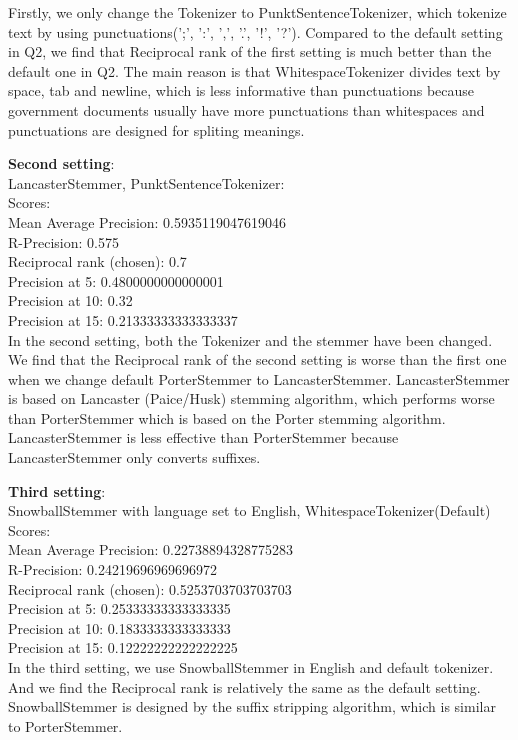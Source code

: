 \documentclass{article}
\begin{document}
Firstly, we only change the Tokenizer to PunktSentenceTokenizer, which tokenize 
text by using punctuations(';', ':', ',', '.', '!', '?'). Compared to the 
default setting in Q2, we find that Reciprocal rank of the first setting is 
much better than the default one in Q2. The main reason is that 
WhitespaceTokenizer divides text by space, tab and newline, which is less 
informative than punctuations because government documents usually have more 
punctuations than whitespaces and punctuations are designed for spliting meanings. 

\noindent
\textbf{Second setting}:\\
LancasterStemmer, PunktSentenceTokenizer:\\
Scores:\\
Mean Average Precision: 0.5935119047619046\\
R-Precision: 0.575\\
Reciprocal rank (chosen): 0.7\\
Precision at 5: 0.4800000000000001\\
Precision at 10: 0.32\\
Precision at 15: 0.21333333333333337\\

In the second setting, both the Tokenizer and the stemmer have been changed. We find that 
the Reciprocal rank of the second setting is worse than the first one when we 
change default PorterStemmer to LancasterStemmer. LancasterStemmer is based on 
Lancaster (Paice/Husk) stemming algorithm, which performs worse than PorterStemmer 
which is based on the Porter stemming algorithm. LancasterStemmer is less effective 
than PorterStemmer because LancasterStemmer only converts suffixes.


\noindent
\textbf{Third setting}:\\
SnowballStemmer with language set to English, WhitespaceTokenizer(Default)\\
Scores:\\
Mean Average Precision: 0.22738894328775283\\
R-Precision: 0.24219696969696972\\
Reciprocal rank (chosen): 0.5253703703703703\\
Precision at 5: 0.25333333333333335\\
Precision at 10: 0.1833333333333333\\
Precision at 15: 0.12222222222222225\\

In the third setting, we use SnowballStemmer in English and default tokenizer. 
And we find the Reciprocal rank is relatively the same as the default setting. 
SnowballStemmer is designed by the suffix stripping algorithm, which is similar 
to PorterStemmer.
\end{document}
